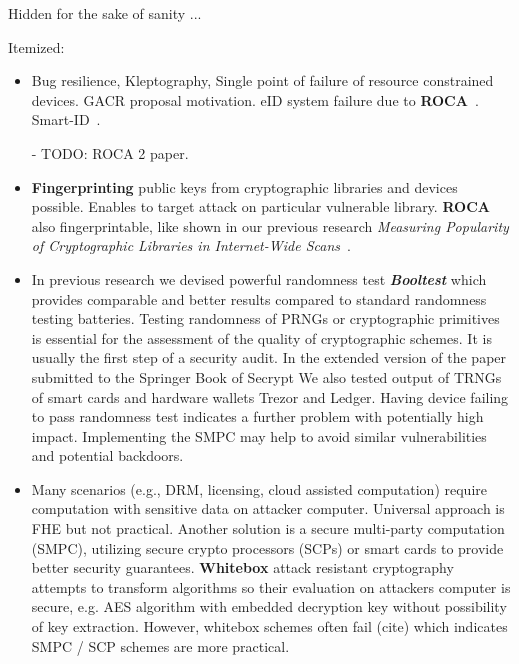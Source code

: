 \documentclass[
  digital, %
  twoside, %
  table,   %
  lof,     %
  lot,     %
]{fithesis3}
\begin{document}
Hidden for the sake of sanity ...
\begin{ecmmnt}  %

Itemized:
\begin{itemize}
	\item Bug resilience, Kleptography, Single point of failure of resource constrained devices. GACR proposal motivation. eID system failure due to {\bf{ROCA}}~\cite{2017-ccs-nemec}. Smart-ID~\cite{smart_id_ee}. 
    
    - TODO: ROCA 2 paper.
        
    \item {\bf{Fingerprinting}} public keys from cryptographic libraries and devices possible. Enables to target attack on particular vulnerable library. {\bf{ROCA}} also fingerprintable, like shown in our previous research {\it{Measuring Popularity of Cryptographic Libraries in Internet-Wide Scans}}~\cite{2017-acsac-nemec}.
    
        \item In previous research we devised powerful randomness test {\bf{\emph{Booltest}}} \cite{booltest_secrypt2017} which provides comparable and better results compared to standard randomness testing batteries. Testing randomness of PRNGs or cryptographic primitives is essential for the assessment of the quality of cryptographic schemes. It is usually the first step of a security audit. In the extended version of the paper submitted to the Springer Book of Secrypt We also tested output of TRNGs of smart cards and hardware wallets Trezor and Ledger. Having device failing to pass randomness test indicates a further problem with potentially high impact. Implementing the SMPC may help to avoid similar vulnerabilities and potential backdoors. 
    
    \item Many scenarios (e.g., DRM, licensing, cloud assisted computation) require computation with sensitive data on attacker computer. Universal approach is FHE but not practical. Another solution is a secure multi-party computation (SMPC), utilizing secure crypto processors (SCPs) or smart cards to provide better security guarantees. {\bf{Whitebox}} attack resistant cryptography \cite{whitebox_klinec_santacrypt2013,Klinec2013thesis} attempts to transform algorithms so their evaluation on attackers computer is secure, e.g. AES algorithm with embedded decryption key without possibility of key extraction. However, whitebox schemes often fail (cite) which indicates SMPC / SCP schemes are more practical.
    

\end{itemize}
\end{ecmmnt}
\end{document}
